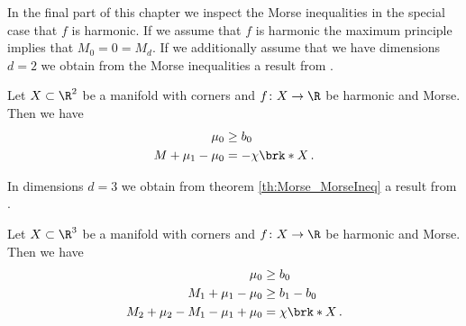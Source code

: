 In the final part of this chapter we inspect the Morse inequalities in the special case
that $f$ is harmonic.
If we assume that $f$ is harmonic the maximum principle implies that
$M_0=0=M_d$.
If we additionally assume that we have dimensions $d=2$ we obtain from the Morse inequalities
a result from \cite[Corollary 10.1]{Morse1969}.
\begin{corollary}
  Let $X\subset\R^2$ be a manifold with corners and $f\colon X\to\R$ be harmonic and Morse.
  Then we have
  \begin{align*}
    \mu_0&\geq b_0 \\
    M+\mu_1-\mu_0&=-\chi\brk*{X}\,.
  \end{align*}
\end{corollary}
In dimensions $d=3$ we obtain from theorem \ref{th:Morse_MorseIneq} a result from \cite[Corollary 10.2]{Morse1969}.
\begin{corollary}
  Let $X\subset\R^3$ be a manifold with corners and $f\colon X\to\R$ be harmonic and Morse.
  Then we have
  \begin{align*}
    \mu_0&\geq b_0 \\
    M_1+\mu_1-\mu_0&\geq b_1-b_0 \\
    M_2+\mu_2-M_1-\mu_1+\mu_0&= \chi\brk*{X}\,.
  \end{align*}
\end{corollary}


